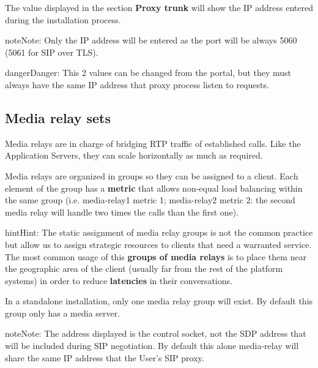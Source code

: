 \documentclass[letterpaper,10pt,english]{sphinxmanual}
\begin{document}
The value displayed in the section \textbf{Proxy trunk} will show the IP address
entered during the installation process.

\begin{notice}{note}{Note:}
Only the IP address will be entered as the port will be always 5060
(5061 for SIP over TLS).
\end{notice}

\begin{notice}{danger}{Danger:}
This 2 values can be changed from the portal, but they must always
have the same IP address that proxy process listen to requests.
\end{notice}


\subsection{Media relay sets}
\label{administration_portal/platform/infrastructure/media_relay_sets::doc}\label{administration_portal/platform/infrastructure/media_relay_sets:media-relay-sets}
Media relays are in charge of bridging RTP traffic of established calls. Like
the Application Servers, they can scale horizontally as much as required.

Media relays are organized in groups so they can be assigned to a client. Each
element of the group has a \textbf{metric} that allows non-equal load balancing
within the same group (i.e. media-relay1 metric 1; media-relay2 metric 2:
the second media relay will handle two times the calls than the first one).

\begin{notice}{hint}{Hint:}
The static assignment of media relay groups is not the common practice
but allow us to assign strategic resources to clients that need a warranted
service. The most common usage of this \textbf{groups of media relays} is to
place them near the geographic area of the client (usually far from the
rest of the platform systems) in order to reduce \textbf{latencies} in their
conversations.
\end{notice}

In a standalone installation, only one media relay group will exist. By default this group only has a media server.

\begin{notice}{note}{Note:}
The address displayed is the control socket, not the SDP address that
will be included during SIP negotiation. By default this alone media-relay
will share the same IP address that the User's SIP proxy.
\end{notice}
\end{document}
